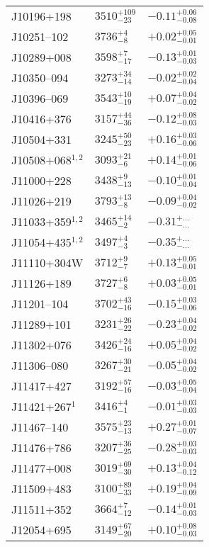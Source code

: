 \documentclass{aa}
\begin{document}
\begin{appendix}
\begin{center}
\begin{xtabular}{lll}
J10196+198 & $3510_{-23}^{+109}$ & $-0.11_{-0.08}^{+0.06}$ \\
J10251--102 & $3736_{-8}^{+4}$ & $+0.02_{-0.01}^{+0.05}$ \\
J10289+008 & $3598_{-17}^{+7}$ & $-0.13_{-0.03}^{+0.01}$ \\
J10350--094 & $3273_{-14}^{+34}$ & $-0.02_{-0.04}^{+0.02}$ \\
J10396--069 & $3543_{-19}^{+10}$ & $+0.07_{-0.02}^{+0.04}$ \\
J10416+376 & $3157_{-36}^{+44}$ & $-0.12_{-0.03}^{+0.08}$ \\
J10504+331 & $3245_{-23}^{+50}$ & $+0.16_{-0.06}^{+0.03}$ \\
J10508+068$^{1,2}$ & $3093_{-6}^{+21}$ & $+0.14_{-0.06}^{+0.01}$ \\
J11000+228 & $3438_{-13}^{+9}$ & $-0.10_{-0.04}^{+0.01}$ \\
J11026+219 & $3793_{-8}^{+13}$ & $-0.09_{-0.02}^{+0.04}$ \\
J11033+359$^{1,2}$ & $3465_{-2}^{+14}$ & $-0.31_{-...}^{+...}$ \\
J11054+435$^{1,2}$ & $3497_{-3}^{+4}$ & $-0.35_{-...}^{+...}$ \\
J11110+304W & $3712_{-7}^{+9}$ & $+0.13_{-0.01}^{+0.05}$ \\
J11126+189 & $3727_{-8}^{+6}$ & $+0.03_{-0.01}^{+0.05}$ \\
J11201--104 & $3702_{-16}^{+43}$ & $-0.15_{-0.06}^{+0.03}$ \\
J11289+101 & $3231_{-22}^{+26}$ & $-0.23_{-0.02}^{+0.04}$ \\
J11302+076 & $3426_{-16}^{+24}$ & $+0.05_{-0.02}^{+0.04}$ \\
J11306--080 & $3267_{-21}^{+30}$ & $-0.05_{-0.02}^{+0.04}$ \\
J11417+427 & $3192_{-16}^{+57}$ & $-0.03_{-0.04}^{+0.05}$ \\
J11421+267$^{1}$ & $3416_{-1}^{+4}$ & $-0.01_{-0.03}^{+0.03}$ \\
J11467--140 & $3575_{-13}^{+23}$ & $+0.27_{-0.07}^{+0.01}$ \\
J11476+786 & $3207_{-25}^{+36}$ & $-0.28_{-0.03}^{+0.03}$ \\
J11477+008 & $3019_{-30}^{+69}$ & $+0.13_{-0.12}^{+0.04}$ \\
J11509+483 & $3100_{-33}^{+89}$ & $+0.19_{-0.09}^{+0.04}$ \\
J11511+352 & $3664_{-12}^{+7}$ & $-0.14_{-0.03}^{+0.01}$ \\
J12054+695 & $3149_{-20}^{+67}$ & $+0.10_{-0.03}^{+0.08}$ \\

\end{xtabular}
\end{center}
\end{appendix}
\end{document}
